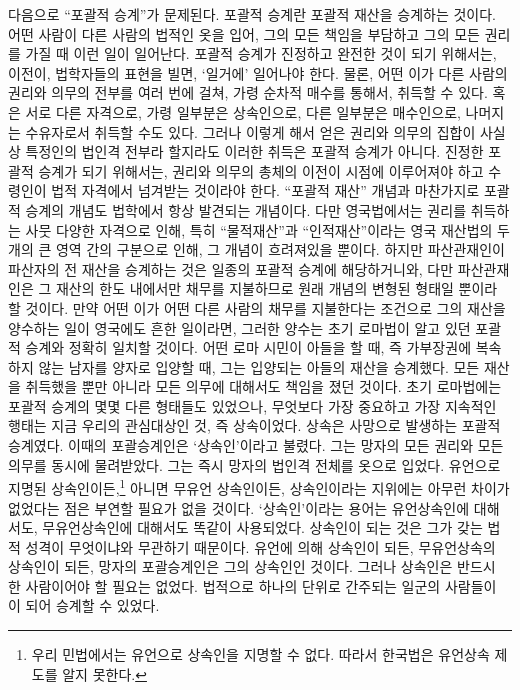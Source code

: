 다음으로 ``포괄적 승계''가 문제된다.
포괄적 승계란 포괄적 재산을 승계하는 것이다.
어떤 사람이 다른 사람의 법적인 옷을 입어,
그의 모든 책임을 부담하고 그의 모든 권리를 가질 때 이런 일이 일어난다.
포괄적 승계가 진정하고 완전한 것이 되기 위해서는,
이전이,
법학자들의 표현을 빌면, `일거에'
일어나야 한다.
물론, 어떤 이가 다른 사람의 권리와 의무의 전부를 여러 번에 걸쳐,
가령 순차적 매수를 통해서, 취득할 수 있다.
혹은 서로 다른 자격으로, 가령 일부분은 상속인으로,
다른 일부분은 매수인으로, 나머지는 수유자로서 취득할 수도 있다.
그러나 이렇게 해서 얻은 권리와 의무의 집합이 사실상 특정인의 법인격 전부라
할지라도 이러한 취득은 포괄적 승계가 아니다.
진정한 포괄적 승계가 되기 위해서는,
권리와 의무의 총체의 이전이  시점에 이루어져야 하고
수령인이  법적 자격에서 넘겨받는 것이라야 한다.
``포괄적 재산'' 개념과 마찬가지로 포괄적 승계의 개념도
법학에서 항상 발견되는 개념이다.
다만 영국법에서는 권리를 취득하는 사뭇 다양한 자격으로 인해,
특히 ``물적재산''과 ``인적재산''이라는
영국 재산법의 두 개의 큰 영역 간의 구분으로 인해, 그 개념이 흐려져있을 뿐이다.
하지만 파산관재인이 파산자의 전 재산을 승계하는 것은
일종의 포괄적 승계에 해당하거니와,
다만
파산관재인은 그 재산의 한도 내에서만 채무를 지불하므로
원래 개념의 변형된 형태일 뿐이라 할 것이다.
만약 어떤 이가 어떤 다른 사람의  채무를 지불한다는 조건으로
그의  재산을 양수하는 일이 영국에도 흔한 일이라면,
그러한 양수는 초기 로마법이 알고 있던 포괄적 승계와 정확히 일치할 것이다.
어떤 로마 시민이 아들을
할 때,
즉 가부장권에 복속하지 않는 남자를 양자로 입양할 때,
그는 입양되는 아들의 재산을  승계했다.
모든 재산을 취득했을 뿐만 아니라 모든 의무에 대해서도 책임을 졌던 것이다.
초기 로마법에는 포괄적 승계의 몇몇 다른 형태들도 있었으나,
무엇보다 가장 중요하고 가장 지속적인 행태는 지금 우리의 관심대상인 것,
즉 상속이었다.
상속은 사망으로 발생하는 포괄적 승계였다.
이때의 포괄승계인은 `상속인'이라고 불렸다.
그는 망자의 모든 권리와 모든 의무를 동시에 물려받았다.
그는 즉시 망자의 법인격 전체를 옷으로 입었다.
유언으로 지명된 상속인이든,\footnote{%
  우리 민법에서는 유언으로 상속인을 지명할 수 없다. 따라서
  한국법은 유언상속 제도를 알지 못한다.}
아니면
무유언 상속인이든, 상속인이라는 지위에는 아무런 차이가 없었다는 점은
부연할 필요가 없을 것이다.
`상속인'이라는 용어는 유언상속인에 대해서도, 무유언상속인에 대해서도
똑같이 사용되었다.
상속인이 되는 것은 그가 갖는 법적 성격이 무엇이냐와
무관하기 때문이다.
유언에 의해 상속인이 되든, 무유언상속의 상속인이 되든,
망자의 포괄승계인은 그의 상속인인 것이다.
그러나 상속인은 반드시 한 사람이어야 할 필요는 없었다.
법적으로 하나의 단위로 간주되는 일군의 사람들이
이 되어 승계할 수 있었다.

